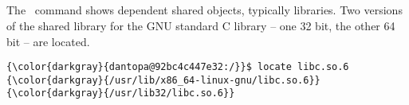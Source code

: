 % 

\subsection{\objdump}
\label{sec:objdump}
The  \ command shows dependent shared objects, typically libraries. Two versions of the shared library for the GNU standard C library -- one 32 bit, the other 64 bit -- are located.
{\footnotesize{
\begin{Verbatim}[commandchars=\\\{\}]
{\color{darkgray}{dantopa@92bc4c447e32:/}}$ locate libc.so.6
{\color{darkgray}{/usr/lib/x86_64-linux-gnu/libc.so.6}}
{\color{darkgray}{/usr/lib32/libc.so.6}}
\end{Verbatim}
}}

\endinput  %
